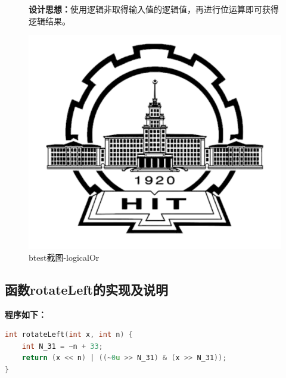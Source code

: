 \begin{figure}[H]
\begin{minipage}[c]{0.5\linewidth}
\textbf{设计思想：}使用逻辑非取得输入值的逻辑值，再进行位运算即可获得逻辑结果。
		
\end{minipage}
\begin{minipage}[c]{0.4\linewidth}
\centering
\includegraphics[width=0.9\linewidth]{figures/HIT}
\caption{btest截图-logicalOr}
\label{fig:logicalOr}
\end{minipage}
\end{figure}

\subsection{函数rotateLeft的实现及说明}
\textbf{程序如下：}
	
\begin{lstlisting}[language = c]
int rotateLeft(int x, int n) {
	int N_31 = ~n + 33;
	return (x << n) | ((~0u >> N_31) & (x >> N_31));
}
\end{lstlisting}
	
